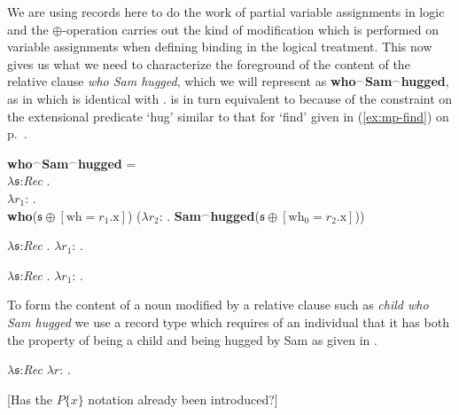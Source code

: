 We are using records here to do the work of partial variable
assignments in logic and the $\oplus$-operation carries out the kind
of modification which is performed on variable assignments when
defining binding in the logical treatment.  This now gives us what we
need to characterize the foreground of the content of the relative
clause \textit{who Sam hugged}, which we will represent as
\textbf{who}$^\frown$\textbf{Sam}$^\frown$\textbf{hugged}, as in
 which is identical with .   is in turn
equivalent to  because of the constraint on the extensional
predicate `hug' similar to that for `find' given in  (\ref{ex:mp-find})
on p.~\pageref{ex:mp-find}. 
\begin{ex} 
\begin{subex} 
 
\item \textbf{who}$^\frown$\textbf{Sam}$^\frown$\textbf{hugged} = \\
  \hspace*{1em}$\lambda\mathfrak{s}$:\textit{Rec} . \\
\hspace*{2em}$\lambda
  r_1$:
  . \\
\hspace*{3em}\textbf{who}($\mathfrak{s}\oplus[\text{wh}=r_1.\text{x}]$)
($\lambda
  r_2$: . \textbf{Sam}$^\frown$\textbf{hugged}($\mathfrak{s}\oplus[\text{wh}_0=r_2.\text{x}]$)) 
 
\item $\lambda\mathfrak{s}$:\textit{Rec} . $\lambda
  r_1$:
  . 

\item $\lambda\mathfrak{s}$:\textit{Rec} . $\lambda
  r_1$:
  .  
 
\end{subex} 
   
\end{ex} 
To form the content of a noun modified by a relative clause such as
\textit{child who Sam hugged} we use a record type which requires of
an individual that it has both the property of being a child and being
hugged by Sam as given in \nexteg{}.
\begin{ex} 
$\lambda\mathfrak{s}$:\textit{Rec} $\lambda
r$:
.   
\end{ex} 
[Has the $P\{x\}$ notation already been introduced?]  



